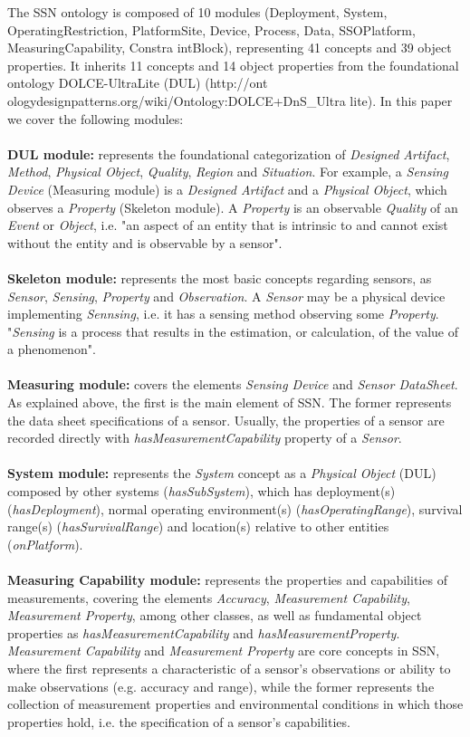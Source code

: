 \documentclass{sig-alternate-05-2015}
\begin{document}
The SSN ontology is composed of 10 modules (Deployment, System, OperatingRestriction, PlatformSite, Device, Process, Data, SSOPlatform, MeasuringCapability, Constra intBlock), representing 41 concepts and 39 object properties. It inherits 11 concepts and 14 object properties from the foundational ontology DOLCE-UltraLite (DUL) (http://ont ologydesignpatterns.org/wiki/Ontology:DOLCE+DnS\_Ultra lite). In this paper we cover the following modules:
\\\\\textbf{DUL module:} represents the foundational categorization of \textit{Designed Artifact}, \textit{Method}, \textit{Physical Object}, \textit{Quality}, \textit{Region} and \textit{Situation}. For example, a \textit{Sensing Device} (Measuring module) is a \textit{Designed Artifact} and a \textit{Physical Object}, which observes a \textit{Property} (Skeleton module). A \textit{Property} is an observable \textit{Quality} of an \textit{Event} or \textit{Object}, i.e. "an aspect of an entity that is intrinsic to and cannot exist without the entity and is observable by a sensor". 
\\\\\textbf{Skeleton module:} represents the most basic concepts regarding sensors, as \textit{Sensor}, \textit{Sensing}, \textit{Property} and  \textit{Observation}. A \textit{Sensor} may be a physical device implementing \textit{Sennsing}, i.e. it has a sensing method observing some \textit{Property}. "\textit{Sensing} is a process that results in the estimation, or calculation, of the value of a phenomenon". 
\\\\\textbf{Measuring module:} covers the elements \textit{Sensing Device} and \textit{Sensor DataSheet}. As explained above, the first is the main element of SSN. The former represents the data sheet specifications of a sensor. Usually, the properties of a sensor are recorded directly with \textit{hasMeasurementCapability} property of a \textit{Sensor}.
\\\\\textbf{System module:} represents the \textit{System} concept as a \textit{Physical Object} (DUL) composed by other systems (\textit{hasSubSystem}), which has deployment(s) (\textit{hasDeployment}), normal operating environment(s) (\textit{hasOperatingRange}), survival range(s) (\textit{hasSurvivalRange}) and location(s) relative to other entities (\textit{onPlatform}).
\\\\\textbf{Measuring Capability module:} represents the properties and capabilities of measurements, covering the elements \textit{Accuracy}, \textit{Measurement Capability}, \textit{Measurement Property}, among other classes, as well as fundamental object properties as \textit{hasMeasurementCapability} and \textit{hasMeasurementProperty}. \textit{Measurement Capability} and \textit{Measurement Property} are core concepts in SSN, where the first represents a characteristic of a sensor's observations or ability to make observations (e.g. accuracy and range), while the former represents the collection of measurement properties and environmental conditions in which those properties hold, i.e. the specification of a sensor's capabilities. 
\end{document}
